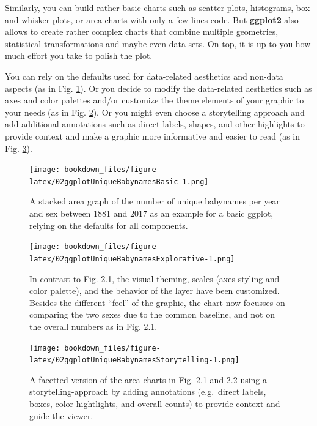 \documentclass[
]{krantz}
\begin{document}
Similarly, you can build rather basic charts such as scatter plots, histograms, box-and-whisker plots, or area charts with only a few lines code. But \textbf{ggplot2} also allows to create rather complex charts that combine multiple geometries, statistical transformations and maybe even data sets. On top, it is up to you how much effort you take to polish the plot.

You can rely on the defaults used for data-related aesthetics and non-data aspects (as in Fig. \ref{fig:02ggplotUniqueBabynamesBasic}). Or you decide to modify the data-related aesthetics such as axes and color palettes and/or customize the theme elements of your graphic to your needs (as in Fig. \ref{fig:02ggplotUniqueBabynamesExplorative}). Or you might even choose a storytelling approach and add additional annotations such as direct labels, shapes, and other highlights to provide context and make a graphic more informative and easier to read (as in Fig. \ref{fig:02ggplotUniqueBabynamesStorytelling}).

\begin{figure}
\centering
\texttt{[image: bookdown\_files/figure-latex/02ggplotUniqueBabynamesBasic-1.png]}
\caption{\label{fig:02ggplotUniqueBabynamesBasic}A stacked area graph of the number of unique babynames per year and sex between 1881 and 2017 as an example for a basic ggplot, relying on the defaults for all components.}
\end{figure}

\begin{figure}
\centering
\texttt{[image: bookdown\_files/figure-latex/02ggplotUniqueBabynamesExplorative-1.png]}
\caption{\label{fig:02ggplotUniqueBabynamesExplorative}In contrast to Fig. 2.1, the visual theming, scales (axes styling and color palette), and the behavior of the layer have been customized. Besides the different ``feel'' of the graphic, the chart now focusses on comparing the two sexes due to the common baseline, and not on the overall numbers as in Fig. 2.1.}
\end{figure}

\begin{figure}
\centering
\texttt{[image: bookdown\_files/figure-latex/02ggplotUniqueBabynamesStorytelling-1.png]}
\caption{\label{fig:02ggplotUniqueBabynamesStorytelling}A facetted version of the area charts in Fig. 2.1 and 2.2 using a storytelling-approach by adding annotations (e.g.~direct labels, boxes, color hightlights, and overall counts) to provide context and guide the viewer.}
\end{figure}
\end{document}
